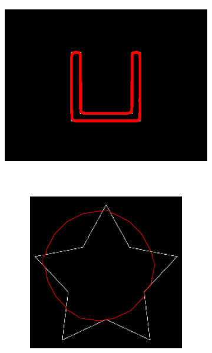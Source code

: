 \begin{appendices}
\begin{figure}[H]
\begin{subfigure}[c]{0.3\linewidth}
\includegraphics[width=\textwidth]{Chapters/Images/Conc/vfcsq}
\caption{}
\end{subfigure}
\\
\begin{subfigure}[c]{0.3\linewidth}
\centering
\includegraphics[width=\textwidth]{Chapters/Images/Conc/star}
\caption{}
\end{subfigure}
\begin{subfigure}[c]{0.3\linewidth}
\centering

\end{subfigure}
\end{figure}
\end{appendices}
